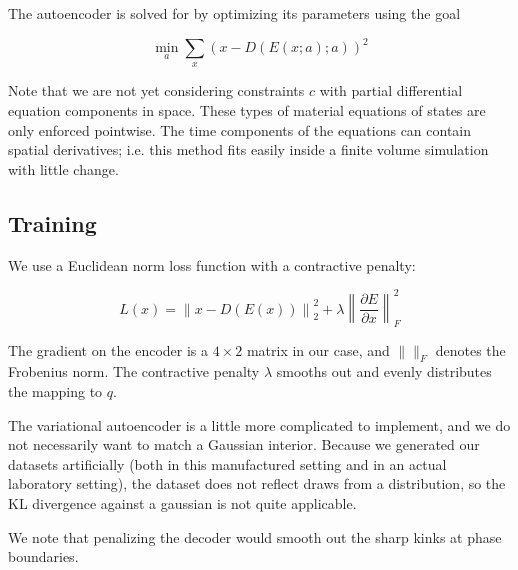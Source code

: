 \documentclass[]{article}
\begin{document}
The autoencoder is solved for by optimizing its parameters using the
goal

\begin{equation}
\min_a \sum_x \left( x - D(E(x;a);a) \right)^2
\end{equation}

Note that we are not yet considering constraints \(c\) with partial
differential equation components in space. These types of material
equations of states are only enforced pointwise. The time components of
the equations can contain spatial derivatives; i.e. this method fits
easily inside a finite volume simulation with little change.

\hypertarget{header-n3305}{%
\subsection{Training}\label{header-n3305}}

We use a Euclidean norm loss function with a contractive penalty:

\[L(x)=\left\|x-D(E(x))\right\|^2_2+\lambda\left\|\frac{\partial E}{\partial x}\right\|_F^2\]

The gradient on the encoder is a \(4\times2\) matrix in our case, and
\(\|\|_F\) denotes the Frobenius norm. The contractive penalty
\(\lambda\) smooths out and evenly distributes the mapping to \(q\).

The variational autoencoder is a little more complicated to implement,
and we do not necessarily want to match a Gaussian interior. Because we
generated our datasets artificially (both in this manufactured setting
and in an actual laboratory setting), the dataset does not reflect draws
from a distribution, so the KL divergence against a gaussian is not
quite applicable.

We note that penalizing the decoder would smooth out the sharp kinks at
phase boundaries.
\end{document}
